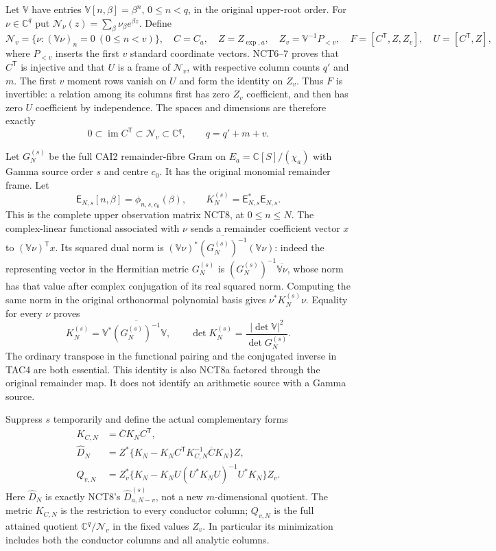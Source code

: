 Let $\mathbb V$ have entries $\mathbb V[n,\beta]=\beta^n$,
$0\le n<q$, in the original upper-root order.  For
$\nu\in\mathbb C^q$ put $\mathcal N_\nu(z)=\sum_\beta\nu_\beta
e^{\beta z}$.  Define
\[
 \mathscr N_v=\{\nu:(\mathbb V\nu)_n=0\ (0\le n<v)\},
 \quad C=C_a,\quad Z=Z_{\exp,a},\quad
 Z_v=\mathbb V^{-1}P_{<v},\quad
 F=[C^{\mathsf T},Z,Z_v],\quad U=[C^{\mathsf T},Z],
 \tag{TAC2}
\]
where $P_{<v}$ inserts the first $v$ standard coordinate vectors.
NCT6--7 proves that $C^{\mathsf T}$ is injective and that $U$ is a
frame of $\mathscr N_v$, with respective column counts $q'$ and $m$.
The first $v$ moment rows vanish on $U$ and form the identity on $Z_v$.
Thus $F$ is invertible: a relation among its columns first has zero
$Z_v$ coefficient, and then has zero $U$ coefficient by independence.
The spaces and dimensions are therefore exactly
\[
 0\subset\operatorname{im}C^{\mathsf T}\subset\mathscr N_v
       \subset\mathbb C^q,\qquad q=q'+m+v.
 \tag{TAC3}
\]

Let $G_N^{(s)}$ be the full CAI2 remainder-fibre Gram on
$E_a=\mathbb C[S]/(\chi_a)$ with Gamma source order $s$ and centre
$c_0$.  It has the original monomial remainder frame.  Let
\[
 \mathsf E_{N,s}[n,\beta]=\phi_{n,s,c_0}(\beta),\qquad
 K_N^{(s)}=\mathsf E_{N,s}^*\mathsf E_{N,s}.
\]
This is the complete upper observation matrix NCT8, at $0\le n\le N$.
The complex-linear functional associated with $\nu$ sends a remainder
coefficient vector $x$ to $(\mathbb V\nu)^{\mathsf T}x$.
Its squared dual norm is
$(\mathbb V\nu)^*\overline{(G_N^{(s)})^{-1}}(\mathbb V\nu)$:
indeed the representing vector in the Hermitian metric $G_N^{(s)}$ is
$(G_N^{(s)})^{-1}\overline{\mathbb V\nu}$, whose norm has that
value after complex conjugation of its real squared norm.
Computing the same norm in the original orthonormal polynomial basis
gives $\nu^*K_N^{(s)}\nu$.  Equality for every $\nu$ proves
\[
 K_N^{(s)}=\mathbb V^*\overline{(G_N^{(s)})^{-1}}\mathbb V,
 \qquad
 \det K_N^{(s)}=\frac{|\det\mathbb V|^2}{\det G_N^{(s)}}.
 \tag{TAC4}
\]
The ordinary transpose in the functional pairing and the conjugated
inverse in TAC4 are both essential.  This identity is also NCT8a
factored through the original remainder map.  It does not identify
an arithmetic source with a Gamma source.

Suppress $s$ temporarily and define the actual complementary forms
\[
 \begin{split}
 K_{C,N}&=\overline C K_N C^{\mathsf T},\\
 \widehat D_N&=Z^*\{K_N-K_NC^{\mathsf T}K_{C,N}^{-1}
                                      \overline C K_N\}Z,\\
 Q_{v,N}&=Z_v^*\{K_N-K_NU(U^*K_NU)^{-1}U^*K_N\}Z_v.
 \end{split}
 \tag{TAC5}
\]
Here $\widehat D_N$ is exactly NCT8's
$\widehat D_{a,N-v}^{(s)}$, not a new $m$-dimensional quotient.
The metric $K_{C,N}$ is the restriction to every conductor column;
$Q_{v,N}$ is the full attained quotient $\mathbb C^q/\mathscr N_v$
in the fixed values $Z_v$.  In particular its minimization includes
both the conductor columns and all analytic columns.

